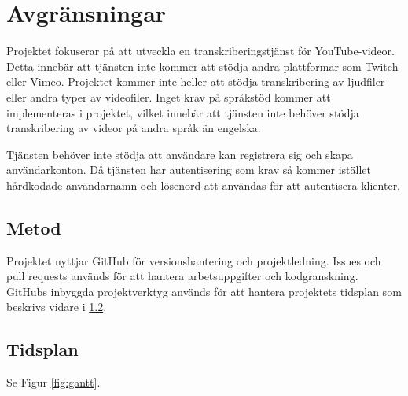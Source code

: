 \section{Avgränsningar}
\label{sec:limitations}
Projektet fokuserar på att utveckla en transkriberingstjänst för
YouTube-videor. Detta innebär att tjänsten inte kommer att stödja andra
plattformar som Twitch eller Vimeo. Projektet kommer inte heller att stödja
transkribering av ljudfiler eller andra typer av videofiler. Inget krav på
språkstöd kommer att implementeras i projektet, vilket innebär att tjänsten
inte behöver stödja transkribering av videor på andra språk än engelska.

Tjänsten behöver inte stödja att användare kan registrera sig och skapa
användarkonton. Då tjänsten har autentisering som krav så kommer istället
hårdkodade användarnamn och lösenord att användas för att autentisera
klienter.

\subsection{Metod}
\label{sec:method}
Projektet nyttjar GitHub för versionshantering och projektledning. Issues och
pull requests används för att hantera arbetsuppgifter och kodgranskning. 
GitHubs inbyggda projektverktyg används för att hantera projektets tidsplan 
som beskrivs vidare i \ref{sec:timeplan}. 

\subsection{Tidsplan}
\label{sec:timeplan}
Se Figur \ref{fig:gantt}.
